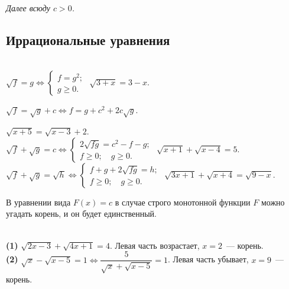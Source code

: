 

\emph{Далее всюду $c > 0$.}
\vspace{-2.5ex}

\subsection*{Иррациональные уравнения}

\begin{tabbing}
\hspace{20em}\=\\[-4ex]
\(
    \sqrt{f} = g
\Leftrightarrow
    \begin{cases}
        f = g^2
    ;\\
        g \geq 0
    .\end{cases}
\)
\>
\problem
$\sqrt{3 + x} = 3 - x$.
\\[2ex]%
\begin{minipage}{20em}
\(
    \sqrt{f} = \sqrt{g} + c
\Leftrightarrow
    f = g + c^2 + 2 c \sqrt{g}
\).
\\[0.5ex]
\end{minipage}
\>
\problem
$\sqrt{x + 5} = \sqrt{x - 3} + 2$.
\\[2ex]%
\(
    \sqrt{f} + \sqrt{g} = c
\Leftrightarrow
    \begin{cases}
        2 \sqrt{fg} = c^2 - f - g
    ;\\
        f \geq 0
    ;\quad
        g \geq 0
    .\end{cases}
\)
\>
\problem
$\sqrt{x + 1} + \sqrt{x - 4} = 5$.
\\[2ex]%
\(
    \sqrt{f} + \sqrt{g} = \sqrt{h}
\Leftrightarrow
    \begin{cases}
        f + g + 2 \sqrt{fg} = h
    ;\\
        f \geq 0
    ;\quad
        g \geq 0
    .\end{cases}
\)
\>
\problem
$\sqrt{3 x + 1} + \sqrt{x + 4} = \sqrt{9 - x}$.
\end{tabbing}

В уравнении вида $F(x) = c$ в случае строго монотонной функции $F$ можно угадать
корень, и он будет единственный.

\example
\\[0.5ex]
\textbf{(1)}
\(
    \sqrt{2 x - 3} + \sqrt{4 x + 1} = 4
\).
Левая часть возрастает, $x = 2$~--- корень.
\\[1ex]
\textbf{(2)}
\(
    \sqrt{x} - \sqrt{x - 5} = 1
\Leftrightarrow
    \dfrac{5}{\sqrt{x} + \sqrt{x - 5}} = 1
\).
Левая часть убывает, $x = 9$~--- корень.


